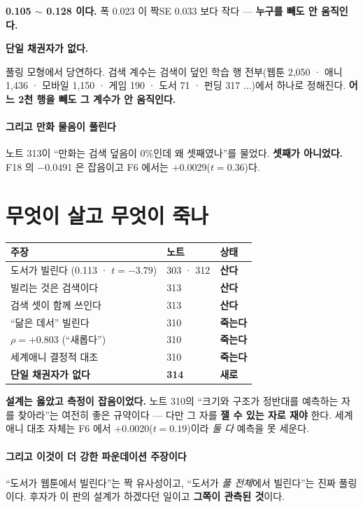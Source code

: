 \documentclass[10pt]{article}
\begin{document}
\textbf{0.105 $\sim$ 0.128 이다.} 폭 0.023 이 짝SE 0.033 보다 작다 ---
\textbf{누구를 빼도 안 움직인다.}

\begin{center}\small
\textbf{단일 채권자가 없다.}
\end{center}

풀링 모형에서 당연하다. 검색 계수는 검색이 덮인 학습 행 전부(웹툰 2,050 ·
애니 1,436 · 모바일 1,150 · 게임 190 · 도서 71 · 펀딩 317 $\ldots$)에서
하나로 정해진다. \textbf{어느 2천 행을 빼도 그 계수가 안 움직인다.}

\paragraph{그리고 만화 물음이 풀린다} 노트 313이 ``만화는 검색 덮음이 0\%인데
왜 셋째였나''를 물었다. \textbf{셋째가 아니었다.} F18 의 $-$0.0491 은 잡음이고
F6 에서는 $+$0.0029($t{=}0.36$)다.

\section{무엇이 살고 무엇이 죽나}

\begin{center}\footnotesize
\begin{tabular}{lll}
\hline
주장 & 노트 & 상태 \\
\hline
도서가 빌린다 (0.113 · $t{=}{-}3.79$) & 303 · 312 & \textbf{산다} \\
빌리는 것은 검색이다 & 313 & \textbf{산다} \\
검색 셋이 함께 쓰인다 & 313 & \textbf{산다} \\
\hline
``닮은 데서'' 빌린다 & 310 & \textbf{죽는다} \\
$\rho{=}{+}0.803$ (``새롭다'') & 310 & \textbf{죽는다} \\
세계애니 결정적 대조 & 310 & \textbf{죽는다} \\
\hline
\textbf{단일 채권자가 없다} & \textbf{314} & \textbf{새로 } \\
\hline
\end{tabular}
\end{center}

\textbf{설계는 옳았고 측정이 잡음이었다.} 노트 310의 ``크기와 구조가 정반대를
예측하는 자를 찾아라''는 여전히 좋은 규약이다 --- 다만 그 자를 \textbf{잴 수
있는 자로 재야} 한다. 세계애니 대조 자체는 F6 에서 $+$0.0020($t{=}0.19$)이라
\emph{둘 다} 예측을 못 세운다.

\paragraph{그리고 이것이 더 강한 파운데이션 주장이다} ``도서가 웹툰에서
빌린다''는 짝 유사성이고, ``도서가 \emph{풀 전체}에서 빌린다''는 진짜 풀링이다.
후자가 이 판의 설계가 하겠다던 일이고 \textbf{그쪽이 관측된 것}이다.
\end{document}
